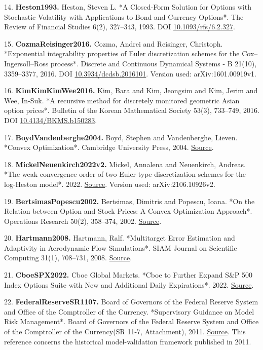 \documentclass[a4paper,11pt]{article}
\begin{document}
14. \textbf{Heston1993.} Heston, Steven L. *A Closed-Form Solution for Options with Stochastic Volatility with Applications to Bond and Currency Options*. The Review of Financial Studies 6(2), 327–343, 1993. DOI \href{https://doi.org/10.1093/rfs/6.2.327}{10.1093/rfs/6.2.327}.

15. \textbf{CozmaReisinger2016.} Cozma, Andrei and Reisinger, Christoph. *Exponential integrability properties of Euler discretization schemes for the Cox–Ingersoll–Ross process*. Discrete and Continuous Dynamical Systems - B 21(10), 3359–3377, 2016. DOI \href{https://doi.org/10.3934/dcdsb.2016101}{10.3934/dcdsb.2016101}. Version used: arXiv:1601.00919v1.

16. \textbf{KimKimKimWee2016.} Kim, Bara and Kim, Jeongsim and Kim, Jerim and Wee, In-Suk. *A recursive method for discretely monitored geometric Asian option prices*. Bulletin of the Korean Mathematical Society 53(3), 733–749, 2016. DOI \href{https://doi.org/10.4134/BKMS.b150283}{10.4134/BKMS.b150283}.

17. \textbf{BoydVandenberghe2004.} Boyd, Stephen and Vandenberghe, Lieven. *Convex Optimization*. Cambridge University Press, 2004. \href{https://web.stanford.edu/~boyd/cvxbook/}{Source}.

18. \textbf{MickelNeuenkirch2022v2.} Mickel, Annalena and Neuenkirch, Andreas. *The weak convergence order of two Euler-type discretization schemes for the log-Heston model*. 2022. \href{https://arxiv.org/abs/2106.10926v2}{Source}. Version used: arXiv:2106.10926v2.

19. \textbf{BertsimasPopescu2002.} Bertsimas, Dimitris and Popescu, Ioana. *On the Relation between Option and Stock Prices: A Convex Optimization Approach*. Operations Research 50(2), 358–374, 2002. \href{https://www.mit.edu/~dbertsim/papers/Finance/On\%20the\%20relation\%20between\%20option\%20and\%20stock\%20prices-\%20a\%20convex\%20optimization\%20approach.pdf}{Source}.

20. \textbf{Hartmann2008.} Hartmann, Ralf. *Multitarget Error Estimation and Adaptivity in Aerodynamic Flow Simulations*. SIAM Journal on Scientific Computing 31(1), 708–731, 2008. \href{https://elib.dlr.de/57073/1/Har08a.pdf}{Source}.

21. \textbf{CboeSPX2022.} Cboe Global Markets. *Cboe to Further Expand S\&P 500 Index Options Suite with New and Additional Daily Expirations*. 2022. \href{https://ir.cboe.com/news/news-details/2022/Cboe-to-Further-Expand-SP-500-Index-Options-Suite-with-New-and-Additional-Daily-Expirations-09-19-2022/default.aspx}{Source}.

22. \textbf{FederalReserveSR1107.} Board of Governors of the Federal Reserve System and Office of the Comptroller of the Currency. *Supervisory Guidance on Model Risk Management*. Board of Governors of the Federal Reserve System and Office of the Comptroller of the Currency(SR 11-7, Attachment), 2011. \href{https://www.federalreserve.gov/boarddocs/srletters/2011/sr1107a1.pdf}{Source}. This reference concerns the historical model-validation framework published in 2011.
\end{document}

